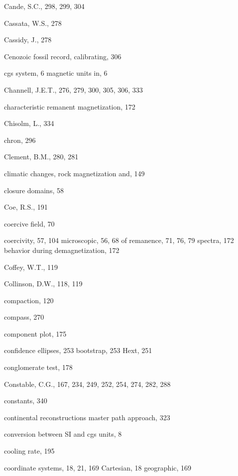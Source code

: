 \documentclass[,plain]{tauxe}
\begin{document}
\begin{theindex}
  \indexspace

  \item Cande, S.C., 298, 299, 304
  \item Cassata, W.S., 278
  \item Cassidy, J., 278
  \item Cenozoic fossil record,
     calibrating, 306
  \item cgs system, 6
    \subitem magnetic units in, 6
  \item Channell, J.E.T., 276, 279, 300, 305, 306, 333
  \item characteristic remanent magnetization, 172
  \item Chisolm, L., 334
  \item chron, 296
  \item Clement, B.M., 280, 281
  \item climatic changes, rock magnetization and, 149
  \item closure domains, 58
  \item Coe, R.S., 191
  \item coercive field, 70
  \item coercivity, 57, 104
    \subitem microscopic, 56, 68
    \subitem of remanence, 71, 76, 79
  \subitem spectra, 172
    \subsubitem behavior during demagnetization, 172
  \item Coffey, W.T., 119
  \item Collinson, D.W., 118, 119
  \item compaction, 120
  \item compass, 270
  \item component plot, 175
  \item confidence ellipses, 253
    \subitem bootstrap, 253
    \subitem Hext, 251
  \item conglomerate test, 178
  \item Constable, C.G., 167, 234, 249, 252, 254, 274, 282, 288
  \item constants, 340
  \item continental reconstructions 
	\subitem master path approach, 323
  \item conversion between SI and cgs units, 8
  \item cooling rate, 195
  \item coordinate systems, 18, 21, 169
    \subitem  Cartesian, 18
    \subitem geographic, 169

\end{theindex}
\end{document}
